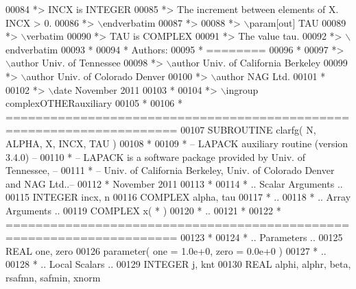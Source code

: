 \begin{DoxyCode}
00084 \textcolor{comment}{*>          INCX is INTEGER}
00085 \textcolor{comment}{*>          The increment between elements of X. INCX > 0.}
00086 \textcolor{comment}{*> \(\backslash\)endverbatim}
00087 \textcolor{comment}{*>}
00088 \textcolor{comment}{*> \(\backslash\)param[out] TAU}
00089 \textcolor{comment}{*> \(\backslash\)verbatim}
00090 \textcolor{comment}{*>          TAU is COMPLEX}
00091 \textcolor{comment}{*>          The value tau.}
00092 \textcolor{comment}{*> \(\backslash\)endverbatim}
00093 \textcolor{comment}{*}
00094 \textcolor{comment}{*  Authors:}
00095 \textcolor{comment}{*  ========}
00096 \textcolor{comment}{*}
00097 \textcolor{comment}{*> \(\backslash\)author Univ. of Tennessee }
00098 \textcolor{comment}{*> \(\backslash\)author Univ. of California Berkeley }
00099 \textcolor{comment}{*> \(\backslash\)author Univ. of Colorado Denver }
00100 \textcolor{comment}{*> \(\backslash\)author NAG Ltd. }
00101 \textcolor{comment}{*}
00102 \textcolor{comment}{*> \(\backslash\)date November 2011}
00103 \textcolor{comment}{*}
00104 \textcolor{comment}{*> \(\backslash\)ingroup complexOTHERauxiliary}
00105 \textcolor{comment}{*}
00106 \textcolor{comment}{*  =====================================================================}
00107 \textcolor{keyword}{      SUBROUTINE }clarfg( N, ALPHA, X, INCX, TAU )
00108 \textcolor{comment}{*}
00109 \textcolor{comment}{*  -- LAPACK auxiliary routine (version 3.4.0) --}
00110 \textcolor{comment}{*  -- LAPACK is a software package provided by Univ. of Tennessee,    --}
00111 \textcolor{comment}{*  -- Univ. of California Berkeley, Univ. of Colorado Denver and NAG Ltd..--}
00112 \textcolor{comment}{*     November 2011}
00113 \textcolor{comment}{*}
00114 \textcolor{comment}{*     .. Scalar Arguments ..}
00115       \textcolor{keywordtype}{INTEGER}            incx, n
00116       \textcolor{keywordtype}{COMPLEX}            alpha, tau
00117 \textcolor{comment}{*     ..}
00118 \textcolor{comment}{*     .. Array Arguments ..}
00119       \textcolor{keywordtype}{COMPLEX}            x( * )
00120 \textcolor{comment}{*     ..}
00121 \textcolor{comment}{*}
00122 \textcolor{comment}{*  =====================================================================}
00123 \textcolor{comment}{*}
00124 \textcolor{comment}{*     .. Parameters ..}
00125       \textcolor{keywordtype}{REAL}               one, zero
00126       parameter( one = 1.0e+0, zero = 0.0e+0 )
00127 \textcolor{comment}{*     ..}
00128 \textcolor{comment}{*     .. Local Scalars ..}
00129       \textcolor{keywordtype}{INTEGER}            j, knt
00130       \textcolor{keywordtype}{REAL}               alphi, alphr, beta, rsafmn, safmin, xnorm

\end{DoxyCode}
